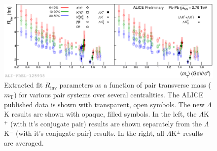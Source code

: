 \documentclass[../AnalysisNoteJBuxton.tex]{subfiles}
\begin{document}
\begin{figure}[h]
  \centering
  \includegraphics[width=\textwidth]{7_ResultsAndDiscussion/Figures/2017-Feb-03-mTscalingQMv2_MinvCalc_OutlinedPoints_OthersTransparent.png}
  \caption[$m_{\mathrm{T}}$ Scaling of Radii]{Extracted fit $R_{\mathrm{inv}}$ parameters as a function of pair transverse mass ($m_{\mathrm{T}}$) for various pair systems over several centralities. The ALICE published data \cite{Adam:2015vja} is shown with transparent, open symbols.  The new $\Lambda$K results are shown with opaque, filled symbols.  In the left, the $\Lambda$K$^{+}$ (with it's conjugate pair) results are shown separately from the $\Lambda$K$^{-}$ (with it's conjugate pair) results.  In the right, all $\Lambda$K$^{\pm}$ results are averaged.}
  \label{fig:mTScalingOfRadii}
\end{figure}
\end{document}
